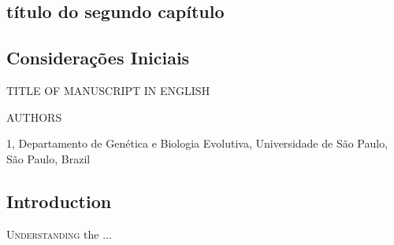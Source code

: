 \begin{refsection}
\chapter{título do segundo capítulo}
\fancyfoot[C]{\thepage}
\setcounter{equation}{0}
\setcounter{figure}{0}
\setcounter{table}{0}
\section{Considerações Iniciais}
\newpage
\begin{otherlanguage}{english}

\begin{center}

\LARGE{TITLE OF MANUSCRIPT IN ENGLISH}

\end{center}

\begin{center}
AUTHORS
\end{center}

\footnotesize{1, Departamento de Genética e Biologia Evolutiva, Universidade de São Paulo, São Paulo, Brazil}


%
\normalsize
\section{Introduction}
\lettrine[lines=3]{\color{airforceblue}U}{nderstanding} the ...%
\renewcommand*{\bibfont}{\footnotesize}
\renewcommand\bibname{References} 

\printbibliography[heading=bibintoc]   


\end{otherlanguage}
\end{refsection}
